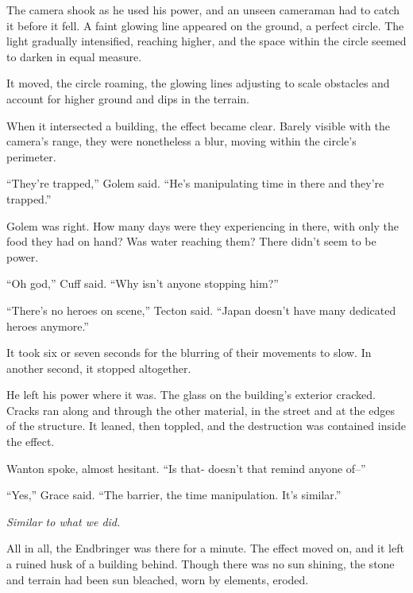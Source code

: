 The camera shook as he used his power, and an unseen cameraman had to catch it before it fell.  A faint glowing line appeared on the ground, a perfect circle.   The light gradually intensified, reaching higher, and the space within the circle seemed to darken in equal measure.



It moved, the circle roaming, the glowing lines adjusting to scale obstacles and account for higher ground and dips in the terrain.



When it intersected a building, the effect became clear.  Barely visible with the camera's range, they were nonetheless a blur, moving within the circle's perimeter.



``They're trapped,'' Golem said.  ``He's manipulating time in there and they're trapped.''



Golem was right.  How many days were they experiencing in there, with only the food they had on hand?  Was water reaching them?  There didn't seem to be power.



``Oh god,'' Cuff said.  ``Why isn't anyone stopping him?''



``There's no heroes on scene,'' Tecton said.  ``Japan doesn't have many dedicated heroes anymore.''



It took six or seven seconds for the blurring of their movements to slow.  In another second, it stopped altogether.



He left his power where it was.  The glass on the building's exterior cracked.  Cracks ran along and through the other material, in the street and at the edges of the structure.  It leaned, then toppled, and the destruction was contained inside the effect.



Wanton spoke, almost hesitant.  ``Is that- doesn't that remind anyone of--''



``Yes,'' Grace said.  ``The barrier, the time manipulation.  It's similar.''



\emph{Similar to what we did.}



All in all, the Endbringer was there for a minute.  The effect moved on, and it left a ruined husk of a building behind.  Though there was no sun shining, the stone and terrain had been sun bleached, worn by elements, eroded.



